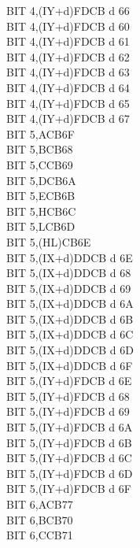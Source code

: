 \begin{multicols}{3}
{\begin{tabbing}
        BIT 4,(IY+d)\>FDCB d 66\\
        BIT 4,(IY+d)\UNDOC\>FDCB d 60\\
        BIT 4,(IY+d)\UNDOC\>FDCB d 61\\
        BIT 4,(IY+d)\UNDOC\>FDCB d 62\\
        BIT 4,(IY+d)\UNDOC\>FDCB d 63\\
        BIT 4,(IY+d)\UNDOC\>FDCB d 64\\
        BIT 4,(IY+d)\UNDOC\>FDCB d 65\\
        BIT 4,(IY+d)\UNDOC\>FDCB d 67\\
        BIT 5,A\>CB6F\\
        BIT 5,B\>CB68\\
        BIT 5,C\>CB69\\
        BIT 5,D\>CB6A\\
        BIT 5,E\>CB6B\\
        BIT 5,H\>CB6C\\
        BIT 5,L\>CB6D\\
        BIT 5,(HL)\>CB6E\\
        BIT 5,(IX+d)\>DDCB d 6E\\
        BIT 5,(IX+d)\UNDOC\>DDCB d 68\\
        BIT 5,(IX+d)\UNDOC\>DDCB d 69\\
        BIT 5,(IX+d)\UNDOC\>DDCB d 6A\\
        BIT 5,(IX+d)\UNDOC\>DDCB d 6B\\
        BIT 5,(IX+d)\UNDOC\>DDCB d 6C\\
        BIT 5,(IX+d)\UNDOC\>DDCB d 6D\\
        BIT 5,(IX+d)\UNDOC\>DDCB d 6F\\
        BIT 5,(IY+d)\>FDCB d 6E\\
        BIT 5,(IY+d)\UNDOC\>FDCB d 68\\
        BIT 5,(IY+d)\UNDOC\>FDCB d 69\\
        BIT 5,(IY+d)\UNDOC\>FDCB d 6A\\
        BIT 5,(IY+d)\UNDOC\>FDCB d 6B\\
        BIT 5,(IY+d)\UNDOC\>FDCB d 6C\\
        BIT 5,(IY+d)\UNDOC\>FDCB d 6D\\
        BIT 5,(IY+d)\UNDOC\>FDCB d 6F\\
        BIT 6,A\>CB77\\
        BIT 6,B\>CB70\\
        BIT 6,C\>CB71\\

\end{tabbing}}
\end{multicols}
